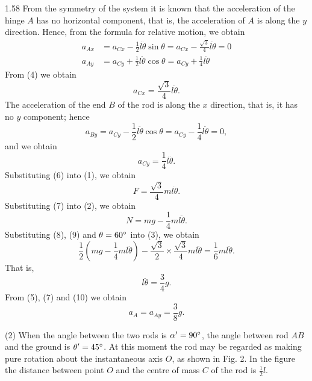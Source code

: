 \begin{solution}{1.58}
From the symmetry of the system it is known that the acceleration of the hinge $A$ has no horizontal component, that is, the acceleration of $A$ is along the $y$ direction. Hence, from the formula for relative motion, we obtain
\begin{align}
a_{Ax}&=a_{Cx}-\frac{1}{2}l\ddot{\theta}\sin\theta=a_{Cx}-\frac{\sqrt{3}}{4}l\ddot{\theta}=0 \tag{4}\\
a_{Ay}&=a_{Cy}+\frac{1}{2}l\ddot{\theta}\cos\theta=a_{Cy}+\frac{1}{4}l\ddot{\theta} \tag{5}
\end{align}
From (4) we obtain
\begin{equation}
a_{Cx}=\frac{\sqrt{3}}{4}l\ddot{\theta}. \tag{6}
\end{equation}
The acceleration of the end $B$ of the rod is along the $x$ direction, that is, it has no $y$ component; hence
\[
a_{By}=a_{Cy}-\frac{1}{2}l\ddot{\theta}\cos\theta=a_{Cy}-\frac{1}{4}l\ddot{\theta}=0,
\]
and we obtain
\begin{equation}
a_{Cy}=\frac{1}{4}l\ddot{\theta}. \tag{7}
\end{equation}
Substituting (6) into (1), we obtain
\begin{equation}
F=\frac{\sqrt{3}}{4}ml\ddot{\theta}. \tag{8}
\end{equation}
Substituting (7) into (2), we obtain
\begin{equation}
N=mg-\frac{1}{4}ml\ddot{\theta}. \tag{9}
\end{equation}
Substituting (8), (9) and $\theta=60^{\circ}$ into (3), we obtain
\[
\frac{1}{2}\left(mg-\frac{1}{4}ml\ddot{\theta}\right)-\frac{\sqrt{3}}{2}\times\frac{\sqrt{3}}{4}ml\ddot{\theta}=\frac{1}{6}ml\ddot{\theta}.
\]
That is,
\begin{equation}
l\ddot{\theta}=\frac{3}{4}g. \tag{10}
\end{equation}
From (5), (7) and (10) we obtain
\[
a_A=a_{Ay}=\frac{3}{8}g.
\]

(2) When the angle between the two rods is $\alpha'=90^{\circ}$, the angle between rod $AB$ and the ground is $\theta'=45^{\circ}$. At this moment the rod may be regarded as making pure rotation about the instantaneous axis $O$, as shown in Fig. 2. In the figure the distance between point $O$ and the centre of mass $C$ of the rod is $\frac{1}{2}l$.
\end{solution}

